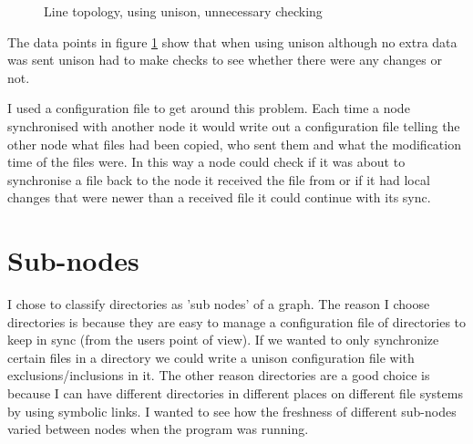 \documentclass[12pt]{article}
\begin{document}
\begin{figure}[htp]
    \caption{Line topology, using unison, unnecessary checking}
    \label{fig:line_uni_tail_graph}
\end{figure}

The data points in figure \ref{fig:line_uni_tail_graph} show that when using
unison although no extra data was sent unison had to make checks to see
whether there were any changes or not.

I used a configuration file to get around this problem. Each time a node
synchronised with another node it would write out a configuration file telling
the other node what files had been copied, who sent them and what the
modification time of the files were. In this way a node could check
if it was about to synchronise a file back to the node it received
the file from or if it had local changes that were newer than a received
file it could continue with its sync.

\section{Sub-nodes}
I chose to classify directories as 'sub nodes' of a graph. The reason I choose
directories is because they are easy to manage a configuration file of directories to
keep in sync (from the users point of view). If we wanted to only synchronize
certain files in a directory we could write a unison configuration file with 
exclusions/inclusions in it. The other reason directories are a good choice
is because I can have different directories in different places on different
file systems by using symbolic links. I wanted to see how the freshness of different
sub-nodes varied between nodes when the program was running.
\end{document}

